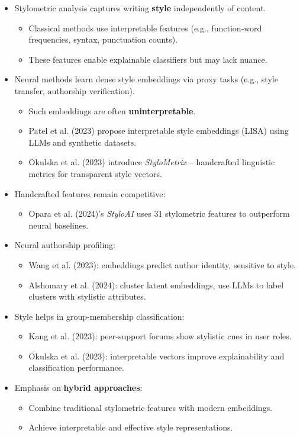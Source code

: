 \begin{itemize}
  \item Stylometric analysis captures writing \textbf{style} independently of content.
        \begin{itemize}
          \item Classical methods use interpretable features (e.g., function-word frequencies, syntax, punctuation counts).
          \item These features enable explainable classifiers but may lack nuance.
        \end{itemize}
  \item Neural methods learn dense style embeddings via proxy tasks (e.g., style transfer, authorship verification).
        \begin{itemize}
          \item Such embeddings are often \textbf{uninterpretable}.
          \item Patel et al. (2023) propose interpretable style embeddings (LISA) using LLMs and synthetic datasets.
          \item Okulska et al. (2023) introduce \textit{StyloMetrix} – handcrafted linguistic metrics for transparent style vectors.
        \end{itemize}
  \item Handcrafted features remain competitive:
        \begin{itemize}
          \item Opara et al. (2024)'s \textit{StyloAI} uses 31 stylometric features to outperform neural baselines.
        \end{itemize}
  \item Neural authorship profiling:
        \begin{itemize}
          \item Wang et al. (2023): embeddings predict author identity, sensitive to style.
          \item Alshomary et al. (2024): cluster latent embeddings, use LLMs to label clusters with stylistic attributes.
        \end{itemize}
  \item Style helps in group-membership classification:
        \begin{itemize}
          \item Kang et al. (2023): peer-support forums show stylistic cues in user roles.
          \item Okulska et al. (2023): interpretable vectors improve explainability and classification performance.
        \end{itemize}
  \item Emphasis on \textbf{hybrid approaches}:
        \begin{itemize}
          \item Combine traditional stylometric features with modern embeddings.
          \item Achieve interpretable and effective style representations.
        \end{itemize}
\end{itemize}

